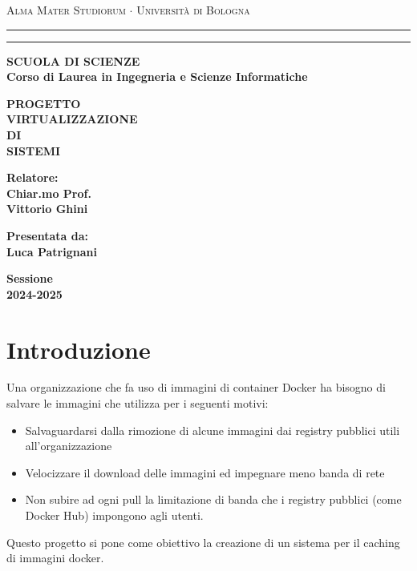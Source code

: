 \documentclass[12pt,a4paper]{report}
\begin{document}
\begin{titlepage}
\begin{center}
{{\Large{\textsc{Alma Mater Studiorum $\cdot$ Universit\`a di
Bologna}}}} \rule[0.1cm]{15.8cm}{0.1mm}
\rule[0.5cm]{15.8cm}{0.6mm}
{\small{\bf SCUOLA DI SCIENZE\\
Corso di Laurea in Ingegneria e Scienze Informatiche }}
\end{center}
\vspace{15mm}
\begin{center}
{\LARGE{\bf PROGETTO}}\\
\vspace{3mm}
{\LARGE{\bf VIRTUALIZZAZIONE}}\\
\vspace{3mm}
{\LARGE{\bf DI}}\\
\vspace{3mm}
{\LARGE{\bf SISTEMI}}\\
\end{center}
\vspace{40mm}
\par
\noindent
\begin{minipage}[t]{0.47\textwidth}
{\large{\bf Relatore:\\
Chiar.mo Prof.\\
Vittorio Ghini}}
\end{minipage}
\hfill
\begin{minipage}[t]{0.47\textwidth}\raggedleft
{\large{\bf Presentata da:\\
Luca Patrignani}}
\end{minipage}
\vspace{20mm}
\begin{center}
{\large{\bf Sessione\\%
2024-2025}}%
\end{center}
\end{titlepage}

\tableofcontents

\chapter{Introduzione}
Una organizzazione che fa uso di immagini di container Docker ha bisogno di salvare le immagini che utilizza per i seguenti motivi:
\begin{itemize}
    \item Salvaguardarsi dalla rimozione di alcune immagini dai registry pubblici utili all'organizzazione
    \item Velocizzare il download delle immagini ed impegnare meno banda di rete
    \item Non subire ad ogni pull la limitazione di banda che i registry pubblici (come Docker Hub) impongono agli utenti.
\end{itemize}
Questo progetto si pone come obiettivo la creazione di un sistema per il caching di immagini docker.
\end{document}
